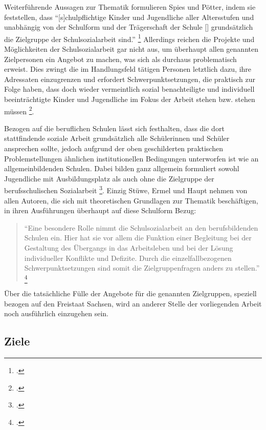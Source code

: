 Weiterführende Aussagen zur Thematik formulieren Spies und Pötter, indem sie feststellen, dass "`[s]chulpflichtige Kinder und Jugendliche aller Altersstufen und unabhängig von der Schulform und der Trägerschaft der Schule [\punkte] grundsätzlich die Zielgruppe der Schulsozialarbeit sind."' \footcite[46]{Spies2011} Allerdings reichen die Projekte und Möglichkeiten der Schulsozialarbeit gar nicht aus, um überhaupt allen genannten Zielpersonen ein Angebot zu machen, was sich als durchaus problematisch erweist. Dies zwingt die im Handlungsfeld tätigen Personen letztlich dazu, ihre Adressaten einzugrenzen und erfordert Schwerpunktsetzungen, die praktisch zur Folge haben, dass doch wieder vermeintlich sozial benachteiligte und individuell beeinträchtigte Kinder und Jugendliche im Fokus der Arbeit stehen bzw. stehen müssen \footcite[vgl.][47]{Spies2011}.
 
Bezogen auf die beruflichen Schulen lässt sich festhalten, dass die dort stattfindende soziale Arbeit grundsätzlich alle Schülerinnen und Schüler ansprechen sollte, jedoch aufgrund der oben geschilderten praktischen Problemstellungen ähnlichen institutionellen Bedingungen unterworfen ist wie an allgemeinbildenden Schulen. Dabei  bilden ganz allgemein formuliert sowohl Jugendliche mit Ausbildungsplatz als auch ohne die Zielgruppe der berufsschulischen Sozialarbeit \footcite[vgl.][5]{ASSB2011}. Einzig Stüwe, Ermel und Haupt nehmen von allen Autoren, die sich mit theoretischen Grundlagen zur Thematik beschäftigen, in ihren Ausführungen überhaupt auf diese Schulform Bezug:

\begin{quotation}
\noindent
"`Eine besondere Rolle nimmt die Schulsozialarbeit an den berufsbildenden Schulen ein. Hier hat sie vor allem die Funktion einer Begleitung bei der Gestaltung des Übergangs in das Arbeitsleben und bei der Lösung individueller Konflikte und Defizite. Durch die einzelfallbezogenen Schwerpunktsetzungen sind somit die Zielgruppenfragen anders zu stellen."' \footcite[74]{Stuewe2015}
\end{quotation}

Über die tatsächliche Fülle der Angebote für die genannten Zielgruppen, speziell bezogen auf den Freistaat Sachsen, wird an anderer Stelle der vorliegenden Arbeit noch ausführlich einzugehen sein.  

\subsection{Ziele}
\label{sec:Ziele}

